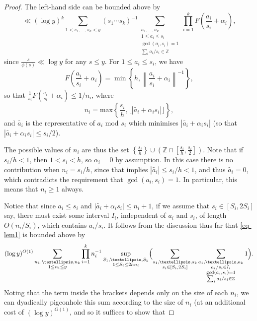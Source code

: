 \documentclass[10pt,a4paper]{amsart}
\newcommand{\ogcd}[2]{\gcd(#1,#2)}
\begin{document}
\begin{proof}
The left-hand side can be bounded above by
\begin{equation}\label{eq-lem1}
\ll (\log y)^k \sum_{1 < s_1, \dots, s_k < y} (s_1 \cdots s_k)^{-1} \sum_{\substack{a_1, \dots, a_k \\ 1 \le a_i \le s_i \\ \ogcd{a_i}{s_i} = 1 \\ \sum_i a_i/s_i \in \mathbb Z}} \prod_{i=1}^k F\left(\frac{a_i}{s_i} + \alpha_i\right),
\end{equation}
since $\frac{s}{\phi(s)} \ll \log y$ for any $s \le y$. For $1 \le a_i \le s_i$, we have
\begin{equation*}
F\left(\frac{a_i}{s_i} +\alpha_i \right) = \min\left\{h, \left\|\frac{a_i}{s_i}+\alpha_i\right\|^{-1}\right\},
\end{equation*}
so that $\frac 1{s_i} F\left(\frac{a_i}{s_i}+\alpha_i\right) \le 1/n_i$, where
\begin{equation*}
n_i = \mathrm{max}\left\{\frac{s_i}{h}, \lfloor |\tilde{a_i} + \alpha_i s_i|\rfloor \right\},
\end{equation*}
and $\tilde{a_i}$ is the representative of $a_i$ mod $s_i$ which minimises $|\tilde{a_i} + \alpha_i s_i|$ (so that $|\tilde{a_i} + \alpha_i s_i|\leq s_i/2$). 

The possible values of $n_i$ are thus the set $\left\{\frac{s_i}{h}\right\} \cup \left(\mathbb Z \cap \left[\frac{s_i}{h},\frac{s_i}{2}\right]\right)$. 
Note that if $s_i/h < 1$, then $1 < s_i < h$, so $\alpha_i = 0$ by assumption. In this case there is no contribution when $n_i = s_i/h$, since that implies $|\tilde{a_i}| \le s_i/h < 1$, and thus $\tilde{a_i} = 0$, which contradicts the requirement that $\ogcd{a_i}{s_i} = 1$. In particular, this means that $n_i \ge 1$ always. 


Notice that since $a_i\leq s_i$ and $\lvert \tilde{a_i}+\alpha_is_i\rvert \leq n_i+1$, if we assume that $s_i\in [S_i,2S_i]$ say, there must exist some interval $I_i$, independent of $a_i$ and $s_i$, of length $O(n_i/S_i)$, which contains $a_i/s_i$. It follows from the discussion thus far that \eqref{eq-lem1} is bounded above by 
\[(\log y)^{O(1)}\sum_{\substack{n_1,\ldots,n_k\\ 1\leq n_i\leq y}}\prod_{i=1}^kn_i^{-1}\sup_{\substack{S_1,\ldots,S_k\\ 1\leq S_i\leq 2hn_i}} \Bigl(\sum_{\substack{s_1, \dots, s_k \\s_i\in [S_i,2S_i]}}\sum_{\substack{a_1, \dots, a_k \\ a_i/s_i \in I_i \\ \ogcd{a_i}{s_i} = 1 \\ \sum_i a_i/s_i \in \mathbb Z}}1\Bigr). \]
Noting that the term inside the brackets depends only on the size of each $n_i$, we can dyadically pigeonhole this sum according to the size of $n_i$ (at an additional cost of $(\log y)^{O(1)}$, and so it suffices to show that 


\end{proof}
\end{document}
